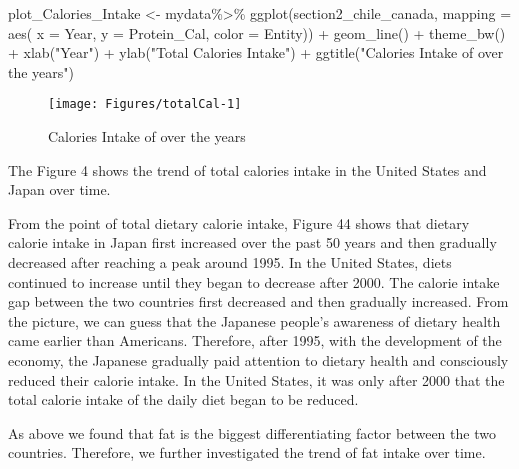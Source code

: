 \documentclass[11pt,a4paper,]{article}
\newenvironment{Shaded}{\begin{snugshade}}{\end{snugshade}}
\newcommand{\AttributeTok}[1]{\textcolor[rgb]{0.77,0.63,0.00}{#1}}
\newcommand{\FunctionTok}[1]{\textcolor[rgb]{0.00,0.00,0.00}{#1}}
\newcommand{\NormalTok}[1]{#1}
\newcommand{\OtherTok}[1]{\textcolor[rgb]{0.56,0.35,0.01}{#1}}
\newcommand{\SpecialCharTok}[1]{\textcolor[rgb]{0.00,0.00,0.00}{#1}}
\newcommand{\StringTok}[1]{\textcolor[rgb]{0.31,0.60,0.02}{#1}}
\begin{document}
\begin{Shaded}
\begin{Highlighting}[]
\NormalTok{plot\_Calories\_Intake }\OtherTok{\textless{}{-}}\NormalTok{ mydata}\SpecialCharTok{\%\textgreater{}\%} 
  \FunctionTok{ggplot}\NormalTok{(section2\_chile\_canada, }\AttributeTok{mapping =}  \FunctionTok{aes}\NormalTok{(}
    \AttributeTok{x =}\NormalTok{ Year, }
    \AttributeTok{y =}\NormalTok{ Protein\_Cal, }
    \AttributeTok{color =}\NormalTok{ Entity)) }\SpecialCharTok{+}
  \FunctionTok{geom\_line}\NormalTok{() }\SpecialCharTok{+}
  \FunctionTok{theme\_bw}\NormalTok{() }\SpecialCharTok{+}
  \FunctionTok{xlab}\NormalTok{(}\StringTok{"Year"}\NormalTok{) }\SpecialCharTok{+}
  \FunctionTok{ylab}\NormalTok{(}\StringTok{"Total Calories Intake"}\NormalTok{) }\SpecialCharTok{+}
  \FunctionTok{ggtitle}\NormalTok{(}\StringTok{"Calories Intake of over the years"}\NormalTok{)}
\end{Highlighting}
\end{Shaded}

\begin{figure}[H]
\texttt{[image: Figures/totalCal-1]}
\caption{Calories Intake of over the years}
\label{fig:totalCal}
\end{figure}

The Figure 4 shows the trend of total calories intake in the United States and Japan over time.

From the point of total dietary calorie intake, Figure 44 shows that dietary calorie intake in Japan first increased over the past 50 years and then gradually decreased after reaching a peak around 1995. In the United States, diets continued to increase until they began to decrease after 2000. The calorie intake gap between the two countries first decreased and then gradually increased.
From the picture, we can guess that the Japanese people's awareness of dietary health came earlier than Americans. Therefore, after 1995, with the development of the economy, the Japanese gradually paid attention to dietary health and consciously reduced their calorie intake. In the United States, it was only after 2000 that the total calorie intake of the daily diet began to be reduced.

As above we found that fat is the biggest differentiating factor between the two countries. Therefore, we further investigated the trend of fat intake over time.
\end{document}
